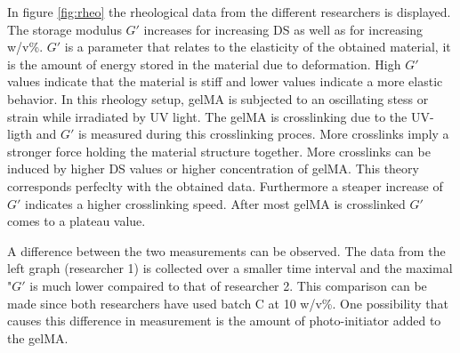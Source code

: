 In figure \ref{fig:rheo} the rheological data from the different researchers is displayed. The storage modulus $G'$ increases for increasing DS as well as for increasing w/v\%. 
$G'$ is a parameter that relates to the elasticity of the obtained material, it is the amount of energy stored in the material due to deformation. High $G'$ values indicate that the material is stiff and lower values indicate a more elastic behavior. 
In this rheology setup, gelMA is subjected to an oscillating stess or strain while irradiated by UV light. The gelMA is crosslinking due to the UV-ligth and $G'$ is measured during this crosslinking proces. More crosslinks imply a stronger force holding the material structure 
together. More crosslinks can be induced by higher DS values or higher concentration of gelMA. This theory corresponds perfeclty with the obtained data. Furthermore a steaper increase of $G'$ indicates a higher crosslinking speed. After most gelMA is crosslinked $G'$ 
comes to a plateau value.

A difference between the two measurements can be observed. The data from the left graph (researcher 1) is collected over a smaller time interval and the maximal "$G'$ is much lower compaired to that of researcher 2. This comparison can be made since both researchers have used batch C at 10 w/v\%. 
One possibility that causes this difference in measurement is the amount of photo-initiator added to the gelMA. 

